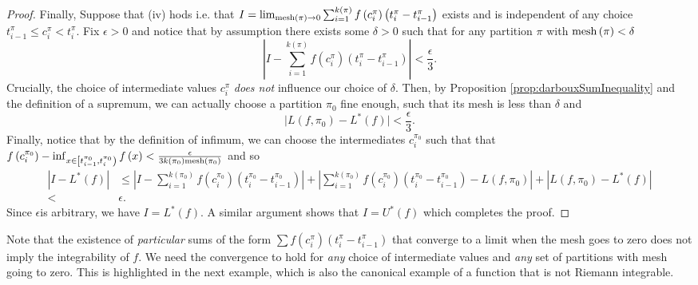 \begin{proof}
Finally, Suppose that (iv) hods i.e. that $I=\lim_{\mathrm{mesh}\left(\pi\right)\to0}\sum_{i=1}^{k\left(\pi\right)}f\left(c_{i}^{\pi}\right)\left(t_{i}^{\pi}-t_{i-1}^{\pi}\right)$
exists and is independent of any choice $t_{i-1}^{\pi}\leq c_{i}^{\pi}<t_{i}^{\pi}$.
Fix $\epsilon>0$ and notice that by assumption there exists some
$\delta>0$ such that for any partition $\pi$ with $\mathrm{mesh}\left(\pi\right)<\delta$
\[
\left\lvert I-\sum_{i=1}^{k\left(\pi\right)}f\left(c_{i}^{\pi}\right)\left(t_{i}^{\pi}-t_{i-1}^{\pi}\right)\right\rvert <\frac{\epsilon}{3}.
\]
Crucially, the choice of intermediate values $c_{i}^{\pi}$\emph{
does not }influence our choice of $\delta.$ Then, by Proposition
\ref{prop:darbouxSumInequality} and the definition of a supremum,
we can actually choose a partition $\pi_{0}$ fine enough, such that
its mesh is less than $\delta$ and
\[
\lvert L\left(f,\pi_{0}\right)-L^{*}\left(f\right)\rvert<\frac{\epsilon}{3}.
\]
Finally, notice that by the definition of infimum, we can choose the
intermediates $c_{i}^{\pi_{0}}$ such that that $f\left(c_{i}^{\pi_{0}}\right)-\inf_{x\in\left[t_{i-1}^{\pi_{0}},t_{i}^{\pi_{0}}\right)}f\left(x\right)<\frac{\epsilon}{3k\left(\pi_{0}\right)\mathrm{mesh}\left(\pi_{0}\right)}$
and so 
\begin{align*}
\left\lvert I-L^{*}\left(f\right)\right\rvert  & \leq\left\lvert I-\sum_{i=1}^{k\left(\pi_{0}\right)}f\left(c_{i}^{\pi_{0}}\right)\left(t_{i}^{\pi_{0}}-t_{i-1}^{\pi_{0}}\right)\right\rvert +\left\lvert \sum_{i=1}^{k\left(\pi_{0}\right)}f\left(c_{i}^{\pi_{0}}\right)\left(t_{i}^{\pi_{0}}-t_{i-1}^{\pi_{0}}\right)-L\left(f,\pi_{0}\right)\right\rvert +\left\lvert L\left(f,\pi_{0}\right)-L^{*}\left(f\right)\right\rvert \\
< & \epsilon.
\end{align*}
Since $\epsilon$is arbitrary, we have $I=L^{*}\left(f\right).$ A
similar argument shows that $I=U^{*}\left(f\right)$ which completes
the proof.
\end{proof}
Note that the existence of \emph{particular }sums of the form $\sum f\left(c_{i}^{\pi}\right)\left(t_{i}^{\pi}-t_{i-1}^{\pi}\right)$
that converge to a limit when the mesh goes to zero does not imply
the integrability of $f.$ We need the convergence to hold for \emph{any
}choice of intermediate values and \emph{any }set of partitions with
mesh going to zero. This is highlighted in the next example, which
is also the canonical example of a function that is not Riemann integrable.
